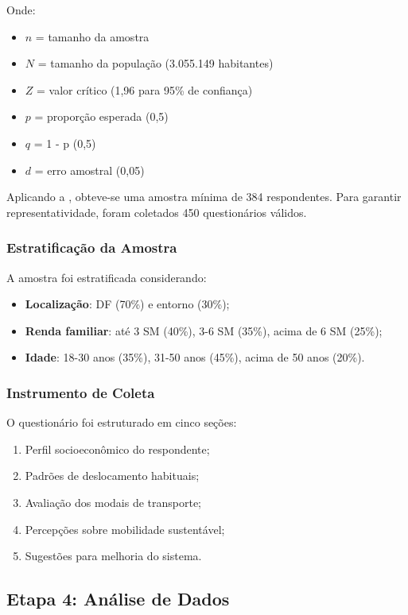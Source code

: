 Onde:
\begin{itemize}
    \item $n$ = tamanho da amostra
    \item $N$ = tamanho da população (3.055.149 habitantes)
    \item $Z$ = valor crítico (1,96 para 95\% de confiança)
    \item $p$ = proporção esperada (0,5)
    \item $q$ = 1 - p (0,5)
    \item $d$ = erro amostral (0,05)
\end{itemize}

Aplicando a , obteve-se uma amostra mínima de 384 respondentes. Para garantir representatividade, foram coletados 450 questionários válidos.

\subsubsection{Estratificação da Amostra}

A amostra foi estratificada considerando:
\begin{itemize}
    \item \textbf{Localização}: DF (70\%) e entorno (30\%);
    \item \textbf{Renda familiar}: até 3 SM (40\%), 3-6 SM (35\%), acima de 6 SM (25\%);
    \item \textbf{Idade}: 18-30 anos (35\%), 31-50 anos (45\%), acima de 50 anos (20\%).
\end{itemize}

\subsubsection{Instrumento de Coleta}

O questionário foi estruturado em cinco seções:
\begin{enumerate}
    \item Perfil socioeconômico do respondente;
    \item Padrões de deslocamento habituais;
    \item Avaliação dos modais de transporte;
    \item Percepções sobre mobilidade sustentável;
    \item Sugestões para melhoria do sistema.
\end{enumerate}

\subsection{Etapa 4: Análise de Dados}

